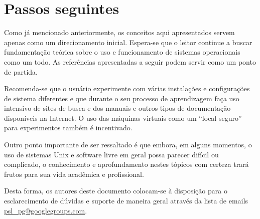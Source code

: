\documentclass{handout_utfpr}
\begin{document}
\section{Passos seguintes}
Como já mencionado anteriormente, os conceitos aqui apresentados servem apenas como um direcionamento inicial. Espera-se que o leitor continue a buscar fundamentação teórica sobre o uso e funcionamento de sistemas operacionais como um todo. As referências apresentadas a seguir podem servir como um ponto de partida.

Recomenda-se que o usuário experimente com várias instalações e configurações de sistema diferentes e que durante o seu processo de aprendizagem faça uso intensivo de sites de busca e dos manuais e outros tipos de documentação disponíveis na Internet. O uso das máquinas virtuais como um ``local seguro'' para experimentos também é incentivado.

Outro ponto importante de ser ressaltado é que embora, em alguns momentos, o uso de sistemas Unix e software livre em geral possa parecer difícil ou complicado, o conhecimento e aprofundamento nestes tópicos com certeza trará frutos para sua vida acadêmica e profissional.

Desta forma, os autores deste documento colocam-se à disposição para o esclarecimento de dúvidas e suporte de maneira geral através da lista de emails \url{psl_pg@googlegroups.com}.

\nocite{Tanenbaum:2007:MOS:1410217}
\nocite{shotts2012linux}
\nocite{anatomy2007}
\nocite{gnu.org}
\nocite{learn2012}
\nocite{linux2013}


\end{document}
